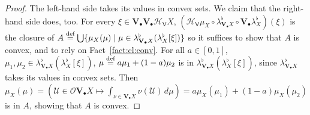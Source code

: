 \documentclass[preprint,12pt]{elsarticle}
\newcommand\eqdef{\mathrel{\buildrel \text{def}\over=}}
\newcommand\Hoare{{\mathcal H}}
\newcommand\Vt{\mathsf{V}}
\newcommand\HV{\Hoare_\Vt}
\newcommand\Val{{\mathbf V}}
\newcommand\Open{{\mathcal O}}
\begin{document}
\begin{proof}
  The left-hand side takes its values in convex sets.  We claim that
  the right-hand side does, too.  For every
  $\xi \in \Val_\bullet {\Val_\bullet {\HV X}}$,
  $(\HV {\mu_X} \circ \lambda^\flat_{\Val_\bullet X} \circ
  \Val_\bullet {\lambda^\flat_X}) (\xi)$ is the closure of
  $A \eqdef \bigcup \{\mu_X (\mu) \mid \mu \in
  \lambda^\flat_{\Val_\bullet X} ({\lambda^\flat_X} [\xi])\}$ so it
  suffices to show that $A$ is convex, and to rely on
  Fact~\ref{fact:cl:conv}.  For all $a \in [0, 1]$,
  $\mu_1, \mu_2 \in \lambda^\flat_{\Val_\bullet X} ({\lambda^\flat_X}
  [\xi])$, $\mu \eqdef a \mu_1 + (1-a) \mu_2$ is in
  $\lambda^\flat_{\Val_\bullet X} ({\lambda^\flat_X} [\xi])$, since
  $\lambda^\flat_{\Val_\bullet X}$ takes its values in convex sets.
  Then
  $\mu_X (\mu) = (\mathcal U \in \Open {\Val_\bullet X} \mapsto \int_{\nu \in
    \Val_\bullet X} \nu (\mathcal U) \,d\mu) = a \mu_X (\mu_1) + (1-a) \mu_X
  (\mu_2)$ is in $A$, showing that $A$ is convex.


\end{proof}
\end{document}

